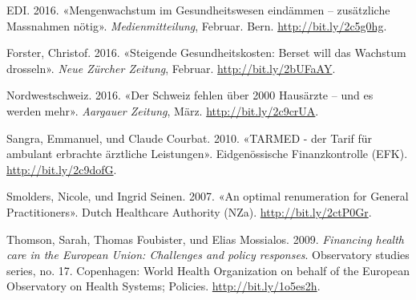 \documentclass[ngerman,a4paper]{article}
\begin{document}
\hypertarget{ref-ediux5fmengenwachstumux5f2016}{}
EDI. 2016. «Mengenwachstum im Gesundheitswesen eindämmen -- zusätzliche
Massnahmen nötig». \emph{Medienmitteilung}, Februar. Bern.
\url{http://bit.ly/2c5g0hg}.

\hypertarget{ref-forsterux5fsteigendeux5f2016}{}
Forster, Christof. 2016. «Steigende Gesundheitskosten: Berset will das
Wachstum drosseln». \emph{Neue Zürcher Zeitung}, Februar.
\url{http://bit.ly/2bUFaAY}.

\hypertarget{ref-nordwestschweizux5fschweizux5f2016}{}
Nordwestschweiz. 2016. «Der Schweiz fehlen über 2000 Hausärzte -- und es
werden mehr». \emph{Aargauer Zeitung}, März.
\url{http://bit.ly/2c9crUA}.

\hypertarget{ref-sangraux5ftarmedux5f2010}{}
Sangra, Emmanuel, und Claude Courbat. 2010. «TARMED - der Tarif für
ambulant erbrachte ärztliche Leistungen». Eidgenössische Finanzkontrolle
(EFK). \url{http://bit.ly/2c9dofG}.

\hypertarget{ref-smoldersux5foptimalux5f2007}{}
Smolders, Nicole, und Ingrid Seinen. 2007. «An optimal renumeration for
General Practitioners». Dutch Healthcare Authority (NZa).
\url{http://bit.ly/2ctP0Gr}.

\hypertarget{ref-thomsonux5ffinancingux5f2009}{}
Thomson, Sarah, Thomas Foubister, und Elias Mossialos. 2009.
\emph{Financing health care in the European Union: Challenges and policy
responses}. Observatory studies series, no. 17. Copenhagen: World Health
Organization on behalf of the European Observatory on Health Systems;
Policies. \url{http://bit.ly/1o5es2h}.
\end{document}
